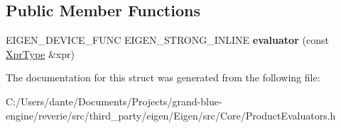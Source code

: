\subsection*{Public Member Functions}
\begin{DoxyCompactItemize}
\item 
\mbox{\label{struct_eigen_1_1internal_1_1evaluator_3_01_product_3_01_lhs_00_01_rhs_00_01_options_01_4_01_4_aa214b83763ebe3491267787b8c128fa2}} 
E\+I\+G\+E\+N\+\_\+\+D\+E\+V\+I\+C\+E\+\_\+\+F\+U\+NC E\+I\+G\+E\+N\+\_\+\+S\+T\+R\+O\+N\+G\+\_\+\+I\+N\+L\+I\+NE {\bfseries evaluator} (const \mbox{\hyperlink{class_eigen_1_1_product}{Xpr\+Type}} \&xpr)
\end{DoxyCompactItemize}


The documentation for this struct was generated from the following file\+:\begin{DoxyCompactItemize}
\item 
C\+:/\+Users/dante/\+Documents/\+Projects/grand-\/blue-\/engine/reverie/src/third\+\_\+party/eigen/\+Eigen/src/\+Core/Product\+Evaluators.\+h\end{DoxyCompactItemize}
